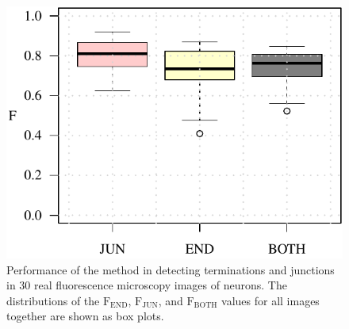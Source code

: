 \begin{figure}
	\centering
	\includegraphics[width=0.4\columnwidth]{overview_real}
	\caption{Performance of the method in detecting terminations and junctions in 30 real fluorescence microscopy images of neurons. The distributions of the $\textrm{F}_\textrm{END}$, $\textrm{F}_\textrm{JUN}$, and $\textrm{F}_\textrm{BOTH}$ values for all images together are shown as box plots.}
	\label{fig17}
\end{figure}
